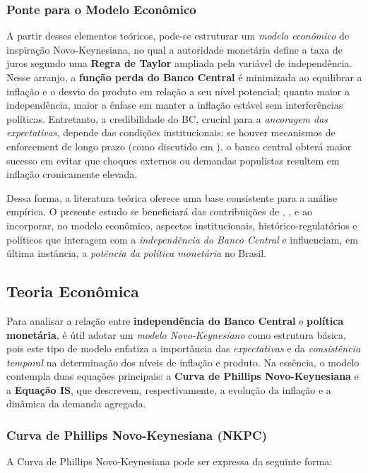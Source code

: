 \documentclass[a4paper,12pt]{article}[abnt2]
\begin{document}
\subsubsection{\textbf{Ponte para o Modelo Econômico}}
A partir desses elementos teóricos, pode-se estruturar um \emph{modelo econômico} de inspiração Novo-Keynesiana, no qual a autoridade monetária define a taxa de juros segundo uma \textbf{Regra de Taylor} ampliada pela variável de independência. Nesse arranjo, a \textbf{função perda do Banco Central} é minimizada ao equilibrar a inflação e o desvio do produto em relação a seu nível potencial; quanto maior a independência, maior a ênfase em manter a inflação estável sem interferências políticas. Entretanto, a credibilidade do BC, crucial para a \emph{ancoragem das expectativas}, depende das condições institucionais: se houver mecanismos de enforcement de longo prazo (como discutido em \cite{jacome2022,acemoglu2008}), o banco central obterá maior sucesso em evitar que choques externos ou demandas populistas resultem em inflação cronicamente elevada.

Dessa forma, a literatura teórica oferece uma base consistente para a análise empírica. O presente estudo se beneficiará das contribuições de \cite{adrian2024}, \cite{jacome2022}, \cite{unsal2023} e \cite{acemoglu2008} ao incorporar, no modelo econômico, aspectos institucionais, histórico-regulatórios e políticos que interagem com a \emph{independência do Banco Central} e influenciam, em última instância, a \emph{potência da política monetária} no Brasil.

\subsection{\textbf{Teoria Econômica}}

Para analisar a relação entre \textbf{independência do Banco Central} e \textbf{política monetária}, é útil adotar um \emph{modelo Novo-Keynesiano} como estrutura básica, pois este tipo de modelo enfatiza a importância das \emph{expectativas} e da \emph{consistência temporal} na determinação dos níveis de inflação e produto. Na essência, o modelo contempla duas equações principais: a \textbf{Curva de Phillips Novo-Keynesiana} e a \textbf{Equação IS}, que descrevem, respectivamente, a evolução da inflação e a dinâmica da demanda agregada.

\subsubsection{\textbf{Curva de Phillips Novo-Keynesiana (NKPC)}}
A Curva de Phillips Novo-Keynesiana pode ser expressa da seguinte forma:
\end{document}
